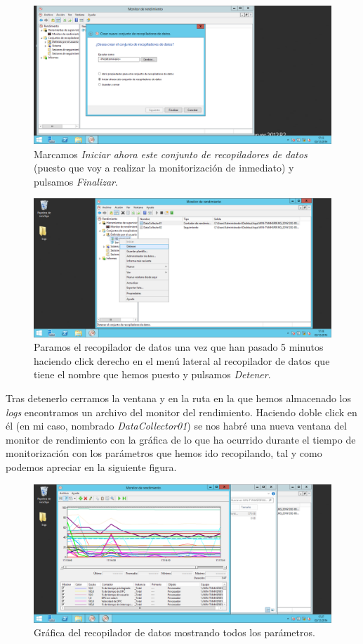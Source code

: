 \begin{figure}[H]
	\centering
	\includegraphics[scale=0.4]{recopilador-9.png}
	\caption{Marcamos \textit{Iniciar ahora este conjunto de recopiladores de datos} (puesto que voy a realizar la monitorización de inmediato) y pulsamos \textit{Finalizar}.}
\end{figure}

\begin{figure}[H]
	\centering
	\includegraphics[scale=0.4]{recopilador-10.png}
	\caption{Paramos el recopilador de datos una vez que han pasado 5 minutos haciendo click derecho en el menú lateral al recopilador de datos que tiene el nombre que hemos puesto y pulsamos \textit{Detener}.}
\end{figure}

Tras detenerlo cerramos la ventana y en la ruta en la que hemos almacenado los \textit{logs} encontramos un archivo del monitor del rendimiento. Haciendo doble click en él (en mi caso, nombrado \textit{DataCollector01}) se nos habré una nueva ventana del monitor de rendimiento con la gráfica de lo que ha ocurrido durante el tiempo de monitorización con los parámetros que hemos ido recopilando, tal y como podemos apreciar en la siguiente figura.
\begin{figure}[H]
	\centering
	\includegraphics[scale=0.4]{recopilador-completo.png}
	\caption{Gráfica del recopilador de datos mostrando todos los parámetros.}
\end{figure}

